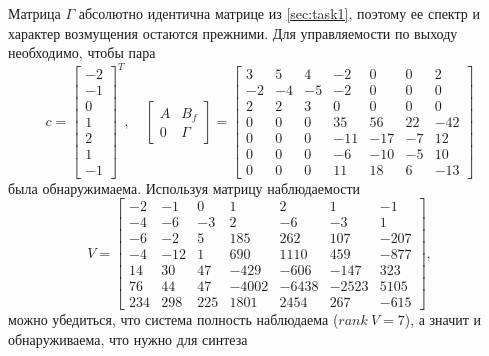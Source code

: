 Матрица $\Gamma$ абсолютно идентична матрице из \autoref{sec:task1},
поэтому ее спектр и характер возмущения остаются прежними. Для
управляемости по выходу необходимо, чтобы пара 
\begin{equation*}
   c=
    \begin{bmatrix}
        -2\\	-1\\	0\\	1\\	2\\	1\\	-1
    \end{bmatrix}^T,\quad
    \begin{bmatrix}
        A&B_f\\0&\Gamma
    \end{bmatrix}=
    \begin{bmatrix}
        3  &  5  &  4  & -2  &  0  &  0  &  2  \\
           -2  & -4  & -5  & -2  &  0  &  0  &  0  \\
        2  &  2  &  3  &  0  &  0  &  0  &  0  \\
        0  &  0  &  0  & 35  & 56  & 22  & -42 \\
        0  &  0  &  0  & -11 & -17 & -7  &  12 \\
        0  &  0  &  0  & -6  & -10 & -5  &  10 \\
        0  &  0  &  0  & 11  & 18  &  6  & -13
    \end{bmatrix}
\end{equation*}
была обнаружимаема. Используя матрицу наблюдаемости
\begin{equation*}
    V=\begin{bmatrix}
        -2   & -1   &  0   &  1   &  2   &  1   & -1 \\
        -4   & -6   & -3   &  2   & -6   & -3   &  1 \\
        -6   & -2   &  5   & 185  & 262  & 107  & -207 \\
        -4   & -12  &  1   & 690  & 1110 & 459  & -877 \\
        14   & 30   & 47   & -429 & -606 & -147 & 323 \\
        76   & 44   & 47   & -4002 & -6438 & -2523 & 5105 \\
        234  & 298  & 225  & 1801 & 2454 & 267  & -615
    \end{bmatrix},
\end{equation*}
можно убедиться, что система полность наблюдаема
($rank\ V = 7$), а значит и обнаруживаема, что нужно для синтеза
